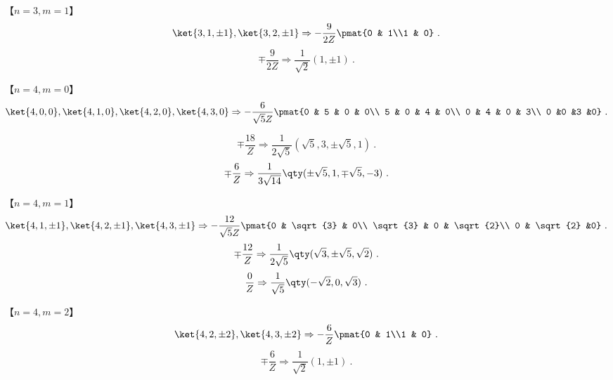 【$n=3, m=1$】
\begin{equation}
\ket{3,1,\pm1},\ket{3,2,\pm1} \Rightarrow
-\frac{9}{2Z}\pmat{0 & 1\\1 & 0}~.
\end{equation}
\begin{equation}
\mp\frac{9}{2Z} \Rightarrow \frac{1}{\sqrt 2}(1, \pm 1)~.
\end{equation}

【$n=4, m=0$】
\begin{equation}
\ket{4,0,0},\ket{4,1,0},\ket{4,2,0},\ket{4,3,0} \Rightarrow -\frac{6}{\sqrt{5}Z}\pmat{0 & 5 & 0 & 0\\ 5 & 0 & 4 & 0\\ 0 & 4 & 0 & 3\\ 0 &0 &3 &0}~.
\end{equation}

\begin{equation}
\mp\frac{18}{Z} \Rightarrow \frac{1}{2\sqrt{5}}(\sqrt{5},3,\pm\sqrt{5},1)~.
\end{equation}
\begin{equation}
\mp\frac{6}{Z} \Rightarrow \frac{1}{3\sqrt{14}}\qty(\pm\sqrt{5}, 1,\mp\sqrt{5},-3)~.
\end{equation}

【$n=4, m=1$】
\begin{equation}
\ket{4,1,\pm1},\ket{4,2,\pm1},\ket{4,3,\pm1} \Rightarrow -\frac{12}{\sqrt{5}Z}\pmat{0 & \sqrt{3} & 0\\ \sqrt{3} & 0 & \sqrt{2}\\ 0 & \sqrt{2} &0}~.
\end{equation}
\begin{equation}
\mp\frac{12}{Z} \Rightarrow \frac{1}{2\sqrt{5}}\qty(\sqrt{3},\pm\sqrt{5},\sqrt{2})~.
\end{equation}
\begin{equation}
\frac{0}{Z} \Rightarrow \frac{1}{\sqrt{5}}\qty(-\sqrt{2},0,\sqrt{3})~.
\end{equation}

【$n=4, m=2$】
\begin{equation}
\ket{4,2,\pm2},\ket{4,3,\pm2} \Rightarrow -\frac{6}{Z}\pmat{0 & 1\\1 & 0}~.
\end{equation}
\begin{equation}
\mp\frac{6}{Z} \Rightarrow \frac{1}{\sqrt{2}}(1,\pm 1)~.
\end{equation}


